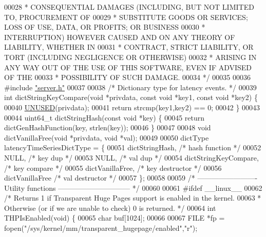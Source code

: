 \begin{DoxyCode}
00028 \textcolor{comment}{ * CONSEQUENTIAL DAMAGES (INCLUDING, BUT NOT LIMITED TO, PROCUREMENT OF}
00029 \textcolor{comment}{ * SUBSTITUTE GOODS OR SERVICES; LOSS OF USE, DATA, OR PROFITS; OR BUSINESS}
00030 \textcolor{comment}{ * INTERRUPTION) HOWEVER CAUSED AND ON ANY THEORY OF LIABILITY, WHETHER IN}
00031 \textcolor{comment}{ * CONTRACT, STRICT LIABILITY, OR TORT (INCLUDING NEGLIGENCE OR OTHERWISE)}
00032 \textcolor{comment}{ * ARISING IN ANY WAY OUT OF THE USE OF THIS SOFTWARE, EVEN IF ADVISED OF THE}
00033 \textcolor{comment}{ * POSSIBILITY OF SUCH DAMAGE.}
00034 \textcolor{comment}{ */}
00035 
00036 \textcolor{preprocessor}{#}\textcolor{preprocessor}{include} \hyperlink{server_8h}{"server.h"}
00037 
00038 \textcolor{comment}{/* Dictionary type for latency events. */}
00039 \textcolor{keywordtype}{int} dictStringKeyCompare(\textcolor{keywordtype}{void} *privdata, \textcolor{keyword}{const} \textcolor{keywordtype}{void} *key1, \textcolor{keyword}{const} \textcolor{keywordtype}{void} *key2) \{
00040     \hyperlink{server_8h_ae7c9dc8f13568a9c856573751f1ee1ec}{UNUSED}(privdata);
00041     \textcolor{keywordflow}{return} strcmp(key1,key2) == 0;
00042 \}
00043 
00044 uint64\_t dictStringHash(\textcolor{keyword}{const} \textcolor{keywordtype}{void} *key) \{
00045     \textcolor{keywordflow}{return} dictGenHashFunction(key, strlen(key));
00046 \}
00047 
00048 \textcolor{keywordtype}{void} dictVanillaFree(\textcolor{keywordtype}{void} *privdata, \textcolor{keywordtype}{void} *val);
00049 
00050 dictType latencyTimeSeriesDictType = \{
00051     dictStringHash,             \textcolor{comment}{/* hash function */}
00052     NULL,                       \textcolor{comment}{/* key dup */}
00053     NULL,                       \textcolor{comment}{/* val dup */}
00054     dictStringKeyCompare,       \textcolor{comment}{/* key compare */}
00055     dictVanillaFree,            \textcolor{comment}{/* key destructor */}
00056     dictVanillaFree             \textcolor{comment}{/* val destructor */}
00057 \};
00058 
00059 \textcolor{comment}{/* ------------------------- Utility functions ------------------------------ */}
00060 
00061 \textcolor{preprocessor}{#}\textcolor{preprocessor}{ifdef} \_\_linux\_\_
00062 \textcolor{comment}{/* Returns 1 if Transparent Huge Pages support is enabled in the kernel.}
00063 \textcolor{comment}{ * Otherwise (or if we are unable to check) 0 is returned. */}
00064 \textcolor{keywordtype}{int} THPIsEnabled(\textcolor{keywordtype}{void}) \{
00065     \textcolor{keywordtype}{char} buf[1024];
00066 
00067     FILE *fp = fopen(\textcolor{stringliteral}{"/sys/kernel/mm/transparent\_hugepage/enabled"},\textcolor{stringliteral}{"r"});

\end{DoxyCode}
